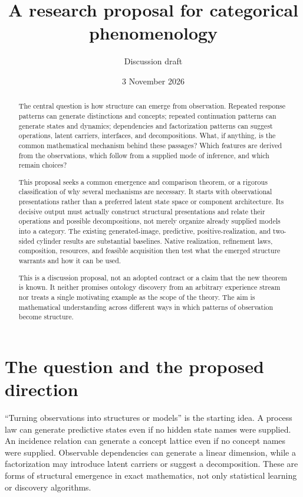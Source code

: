 \documentclass[11pt]{article}
\title{A research proposal for categorical phenomenology}
\author{Discussion draft}
\date{3 November 2026}
\theoremstyle{remark}
\begin{document}
\maketitle
\begin{abstract}
The central question is how structure can emerge from observation. Repeated response patterns can generate distinctions and concepts; repeated continuation patterns can generate states and dynamics; dependencies and factorization patterns can suggest operations, latent carriers, interfaces, and decompositions. What, if anything, is the common mathematical mechanism behind these passages? Which features are derived from the observations, which follow from a supplied mode of inference, and which remain choices?

This proposal seeks a common emergence and comparison theorem, or a rigorous classification of why several mechanisms are necessary. It starts with observational presentations rather than a preferred latent state space or component architecture. Its decisive output must actually construct structural presentations and relate their operations and possible decompositions, not merely organize already supplied models into a category. The existing generated-image, predictive, positive-realization, and two-sided cylinder results are substantial baselines. Native realization, refinement laws, composition, resources, and feasible acquisition then test what the emerged structure warrants and how it can be used.

This is a discussion proposal, not an adopted contract or a claim that the new theorem is known. It neither promises ontology discovery from an arbitrary experience stream nor treats a single motivating example as the scope of the theory. The aim is mathematical understanding across different ways in which patterns of observation become structure.
\end{abstract}
\tableofcontents

\section{The question and the proposed direction}
\label{sec:question}

``Turning observations into structures or models'' is the starting idea. A process law can generate predictive states even if no hidden state names were supplied. An incidence relation can generate a concept lattice even if no concept names were supplied. Observable dependencies can generate a linear dimension, while a factorization may introduce latent carriers or suggest a decomposition. These are forms of structural emergence in exact mathematics, not only statistical learning or discovery algorithms.
\end{document}
